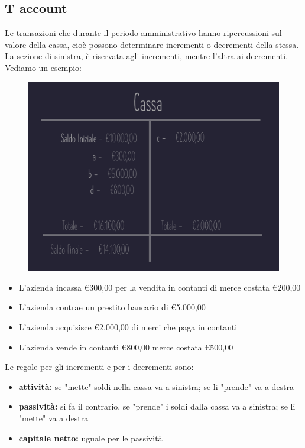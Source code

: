 \documentclass{article}
\begin{document}
\subsection{T account}
Le transazioni che durante il periodo amministrativo hanno ripercussioni sul valore della cassa, cioè possono determinare incrementi o decrementi della stessa.\\
La sezione di sinistra, è riservata agli incrementi, mentre l'altra ai decrementi.
\vspace*{0.2cm}\\
Vediamo un esempio:\\ 
\begin{figure}
    \centering
    \includegraphics[width=1\linewidth]{Image/Esempio_Taccount_1.png}
\end{figure}
\begin{itemize}
    \item L'azienda incassa €300,00 per la vendita in contanti di merce costata €200,00
    \item L'azienda contrae un prestito bancario di €5.000,00
    \item L'azienda acquisisce €2.000,00 di merci che paga in contanti
    \item L'azienda vende in contanti €800,00 merce costata €500,00
\end{itemize}
Le regole per gli incrementi e per i decrementi sono:
\begin{itemize}
    \item \textbf{attività:} se "mette" soldi nella cassa va a sinistra; se li "prende" va a destra
    \item \textbf{passività:} si fa il contrario, se "prende" i soldi dalla cassa va a sinistra; se li "mette" va a destra
    \item \textbf{capitale netto:} uguale per le passività
\end{itemize}
\end{document}
